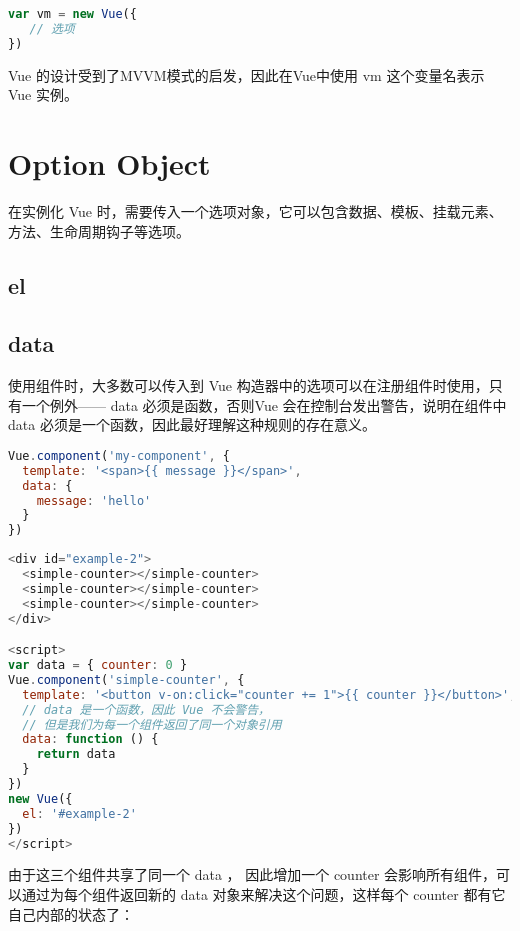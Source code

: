 \begin{lstlisting}[language=JavaScript]
var vm = new Vue({
   // 选项
})
\end{lstlisting}


 Vue 的设计受到了MVVM模式的启发，因此在Vue中使用 vm 这个变量名表示 Vue 实例。
 
 

 
 \section{Option Object}


在实例化 Vue 时，需要传入一个选项对象，它可以包含数据、模板、挂载元素、方法、生命周期钩子等选项。

\subsection{el}


\subsection{data}


使用组件时，大多数可以传入到 Vue 构造器中的选项可以在注册组件时使用，只有一个例外—— data 必须是函数，否则Vue 会在控制台发出警告，说明在组件中 data 必须是一个函数，因此最好理解这种规则的存在意义。



\begin{lstlisting}[language=JavaScript]
Vue.component('my-component', {
  template: '<span>{{ message }}</span>',
  data: {
    message: 'hello'
  }
})
\end{lstlisting}


\begin{lstlisting}[language=JavaScript]
<div id="example-2">
  <simple-counter></simple-counter>
  <simple-counter></simple-counter>
  <simple-counter></simple-counter>
</div>

<script>
var data = { counter: 0 }
Vue.component('simple-counter', {
  template: '<button v-on:click="counter += 1">{{ counter }}</button>',
  // data 是一个函数，因此 Vue 不会警告，
  // 但是我们为每一个组件返回了同一个对象引用
  data: function () {
    return data
  }
})
new Vue({
  el: '#example-2'
})
</script>
\end{lstlisting}

由于这三个组件共享了同一个 data ， 因此增加一个 counter 会影响所有组件，可以通过为每个组件返回新的 data 对象来解决这个问题，这样每个 counter 都有它自己内部的状态了：

